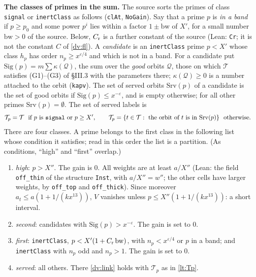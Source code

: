 \documentclass[11pt,letterpaper]{article}
\begin{document}
\textbf{The classes of primes in the sum.} The source sorts the primes of class \texttt{signal} or
\texttt{inertClass} as follows (\texttt{clAt}, \texttt{NoGain}). Say that a prime $p$ is \emph{in a band}
if $p\ge p_0$ and some power $p^i$ lies within a factor $1\pm\mathrm{bw}$ of $X'$, for a small number
$\mathrm{bw}>0$ of the source. Below, $C_{\rm r}$ is a further constant of the source (Lean: \texttt{Cr}; it
is not the constant $C$ of \eqref{dv:fl}). A \emph{candidate} is an \texttt{inertClass} prime $p<X'$ whose class $h_p$
has order $n_p\ge x^{\varepsilon/4}$ and which is not in a band. For a candidate put
$\mathrm{Sig}(p)=m\sum\kappa(\mathcal Q)$, the sum over the \emph{good} orbits $\mathcal Q$, those on
which $\mathcal T$ satisfies (G1)--(G3) of \S III.3 with the parameters there; $\kappa(\mathcal Q)\ge0$ is a
number attached to the orbit (\texttt{kapv}). The set of served orbits $\mathrm{Srv}(p)$ of a candidate is
the set of good orbits if $\mathrm{Sig}(p)\le x^{-\varepsilon}$, and is empty otherwise; for all other
primes $\mathrm{Srv}(p)=\emptyset$. The set of served labels is
\begin{equation}\label{lt:Tp}
 \mathcal T_p=\mathcal T\ \ \text{if $p$ is \texttt{signal} or }p\ge X',\qquad
 \mathcal T_p=\{t\in\mathcal T:\ \text{the orbit of $t$ is in }\mathrm{Srv}(p)\}\ \ \text{otherwise.}
\end{equation}
There are four classes. A prime belongs to the first class in the following list whose condition it
satisfies; read in this order the list is a partition. (As conditions, ``high'' and ``first'' overlap.)
\begin{enumerate}[label=\textup{\arabic*.},leftmargin=2.0em,itemsep=1pt,topsep=2pt]
\item \emph{high}: $p>X''$. The gain is $0$. All weights are at least $a/X''$ (Lean: the field
\texttt{off\_thin} of the structure \texttt{Inst}, with $a/X''=w''$; the other cells have larger weights,
by \texttt{off\_top} and \texttt{off\_thick}). Since moreover
$a_t\le a(1+1/(kx^{13}))$, $V$ vanishes unless $p\le X''(1+1/(kx^{13}))$: a short interval.
\item \emph{second}: candidates with $\mathrm{Sig}(p)>x^{-\varepsilon}$. The gain is set to $0$.
\item \emph{first}: \texttt{inertClass}, $p<X'(1+C_{\rm r}\,\mathrm{bw})$, with $n_p<x^{\varepsilon/4}$ or $p$ in a
band; and \texttt{inertClass} with $n_p$ odd and $n_p>1$. The gain is set to $0$.
\item \emph{served}: all others. There \eqref{dv:link} holds with $\mathcal T_p$ as in \eqref{lt:Tp}.
\end{enumerate}
\end{document}
